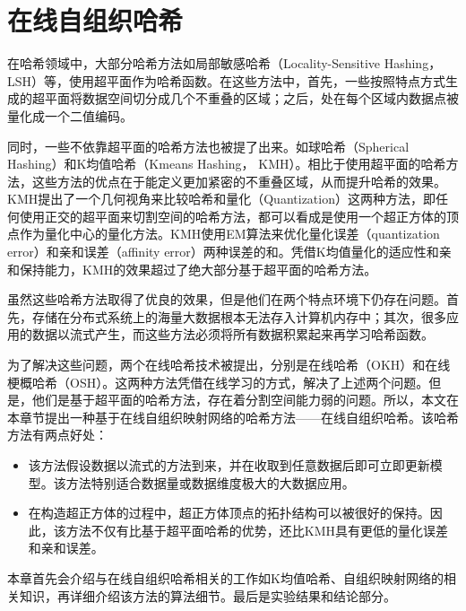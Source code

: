 
\chapter{ 在线自组织哈希}
\label{chap:SOH}

在哈希领域中，大部分哈希方法如局部敏感哈希（Locality-Sensitive Hashing，LSH）等，使用超平面作为哈希函数。在这些方法中，首先，一些按照特点方式生成的超平面将数据空间切分成几个不重叠的区域；之后，处在每个区域内数据点被量化成一个二值编码。

同时，一些不依靠超平面的哈希方法也被提了出来。如球哈希（Spherical Hashing）和K均值哈希（Kmeans Hashing， KMH）。相比于使用超平面的哈希方法，这些方法的优点在于能定义更加紧密的不重叠区域，从而提升哈希的效果。KMH提出了一个几何视角来比较哈希和量化（Quantization）这两种方法，即任何使用正交的超平面来切割空间的哈希方法，都可以看成是使用一个超正方体的顶点作为量化中心的量化方法。KMH使用EM算法来优化量化误差（quantization error）和亲和误差（affinity error）两种误差的和。凭借K均值量化的适应性和亲和保持能力，KMH的效果超过了绝大部分基于超平面的哈希方法。

虽然这些哈希方法取得了优良的效果，但是他们在两个特点环境下仍存在问题。首先，存储在分布式系统上的海量大数据根本无法存入计算机内存中；其次，很多应用的数据以流式产生，而这些方法必须将所有数据积累起来再学习哈希函数。

为了解决这些问题，两个在线哈希技术被提出，分别是在线哈希（OKH）和在线梗概哈希（OSH）。这两种方法凭借在线学习的方式，解决了上述两个问题。但是，他们是基于超平面的哈希方法，存在着分割空间能力弱的问题。所以，本文在本章节提出一种基于在线自组织映射网络的哈希方法——在线自组织哈希。该哈希方法有两点好处：
 \begin{itemize}
 	\item 该方法假设数据以流式的方法到来，并在收取到任意数据后即可立即更新模型。该方法特别适合数据量或数据维度极大的大数据应用。
 	\item 在构造超正方体的过程中，超正方体顶点的拓扑结构可以被很好的保持。因此，该方法不仅有比基于超平面哈希的优势，还比KMH具有更低的量化误差和亲和误差。
 \end{itemize}

本章首先会介绍与在线自组织哈希相关的工作如K均值哈希、自组织映射网络的相关知识，再详细介绍该方法的算法细节。最后是实验结果和结论部分。

